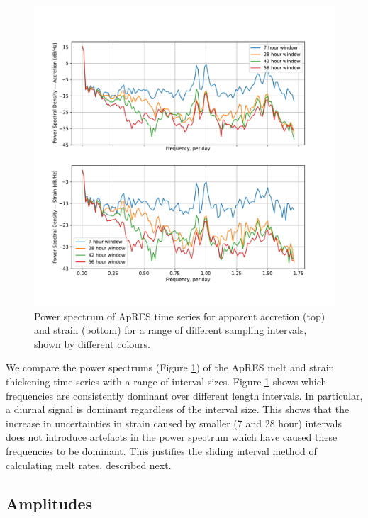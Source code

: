 \begin{figure}[!ht]
\centering
\includegraphics[width=1\textwidth]{chapters/3/compare_window.pdf}
\caption[Window comparison]{Power spectrum of ApRES time series for apparent accretion (top) and strain (bottom) for a range of different sampling intervals, shown by different colours.}
\label{fig:compare_window}
\end{figure}
We compare the power spectrums (Figure \ref{fig:compare_window}) of the ApRES melt and strain thickening time series with a range of interval sizes. Figure \ref{fig:compare_window}  shows which frequencies are consistently dominant over different length intervals. In particular, a diurnal signal is dominant regardless of the interval size. This shows that the increase in uncertainties in strain caused by smaller (7 and 28 hour) intervals does not introduce artefacts in the power spectrum which have caused these frequencies to be dominant. This justifies the sliding interval method of calculating melt rates, described next.


\subsection{Amplitudes}

